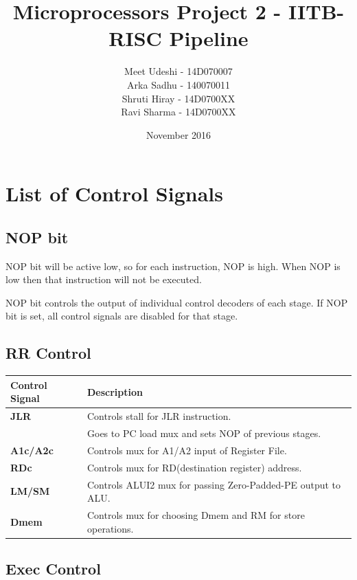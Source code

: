 \documentclass{article}
\title{Microprocessors Project 2 - IITB-RISC Pipeline}
\author{Meet Udeshi - 14D070007\\
Arka Sadhu - 140070011\\
Shruti Hiray - 14D0700XX\\
Ravi Sharma - 14D0700XX
}
\date{November 2016}
\begin{document}
\maketitle                      
 
\section*{List of Control Signals}

\subsection*{NOP bit}

NOP bit will be active low, so for each instruction, NOP is high. When NOP is
low then that instruction will not be executed.

NOP bit controls the output of individual control decoders of each stage.
If NOP bit is set, all control signals are disabled for that stage.

\subsection*{RR Control}

\begin{tabular}{|l|l|}
\hline
\textbf{Control Signal} & \textbf{Description}\\
\hline
\textbf{JLR} & Controls stall for JLR instruction. \\
             & Goes to PC load mux and sets NOP of previous stages.\\
\hline
\textbf{A1c/A2c} & Controls mux for A1/A2 input of Register File.\\
\hline
\textbf{RDc} & Controls mux for RD(destination register) address.\\
\hline
\textbf{LM/SM} & Controls ALUI2 mux for passing Zero-Padded-PE output to ALU.\\
\hline
\textbf{Dmem} & Controls mux for choosing Dmem and RM for store operations.\\
\hline
\end{tabular}

\subsection*{Exec Control}
\end{document}
